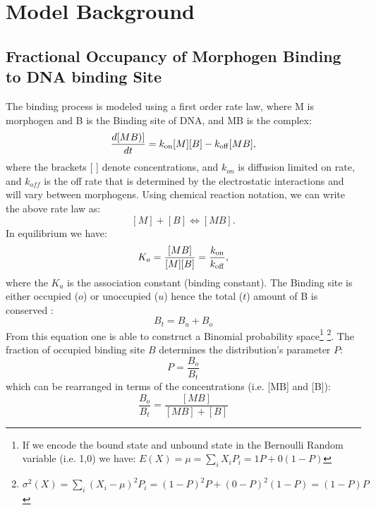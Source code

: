 
 \section{Model Background}

 \subsection{Fractional Occupancy of Morphogen Binding to DNA binding Site}

The binding process is modeled using a first order rate law, where M is morphogen and B is the Binding site of DNA, and MB is the complex:
\begin{equation}\label{}
    \frac{d [MB)]}{dt}= k_{\rm{on}}[M][B] - k_{\rm{off}}[MB],
\end{equation}
where the brackets [ ] denote concentrations, and $k_{on}$ is diffusion limited on rate,  and $k_{off}$ is the off rate that is determined by the electrostatic interactions and will vary between morphogens.  Using chemical reaction notation, we can write the above rate law as:
\begin{equation}\label{}
    [M] + [B] \Leftrightarrow [MB].
\end{equation}
In equilibrium we have:
\begin{equation}\label{ka}
  K_{a} =  \frac{[MB]}{[M][B]}= \frac{k_{\rm{on}} }{k_{\rm{off}}},
\end{equation}
where the $K_{a}$ is the association constant (binding constant).
The Binding site is either occupied ($o$) or unoccupied ($u$) hence the total ($t$) amount of B is conserved :
\begin{equation}\label{}
    B_{t} = B_{u} + B_{o}
\end{equation}
From this equation one is able to construct a Binomial probability space\footnote[2]{If we encode the bound state and unbound state in the Bernoulli Random variable (i.e. 1,0) we have: $E(X) = \mu = \sum_i X_i P_i = 1 P + 0 (1-P) $} \footnote[3]{ $\sigma^2 (X) =\sum_i (X_i-\mu)^2 P_i = (1-P)^2P + (0-P)^2(1-P) = (1-P)P $ }.  The fraction of occupied binding site $B$ determines the distribution's parameter $P$:
\begin{equation}\label{}
   P = \frac{B_{o}}{B_{t}}
\end{equation}
which can be rearranged in terms of the concentrations (i.e. [MB] and [B]):
\begin{equation}\label{Zb}
    \frac{B_{o}}{B_{t}} =\frac{[MB]}{[MB] + [B]}
\end{equation}

